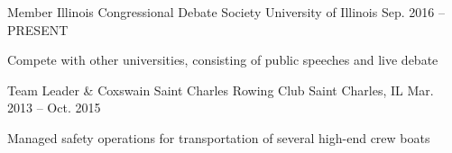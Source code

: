 

\begin{cventries}

  \cventry
    {Member} %
    {Illinois Congressional Debate Society} %
    {University of Illinois} %
    {Sep. 2016 -- PRESENT} %
    {
      \begin{cvitems} %
        \item {Compete with other universities, consisting of public speeches and live debate}
      \end{cvitems}
    }

  \cventry
    {Team Leader \& Coxswain} %
    {Saint Charles Rowing Club} %
    {Saint Charles, IL} %
    {Mar. 2013 -- Oct. 2015} %
    {
      \begin{cvitems} %
        \item {Managed safety operations for transportation of several high-end crew boats}
      \end{cvitems}
    }

\end{cventries}
